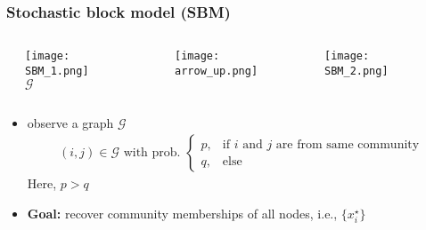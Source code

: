 \documentclass[compress,
mathserif,wide,%
]{beamer}
\begin{document}
\begin{frame}
	\frametitle{Stochastic block model (SBM)}

\vspace{-1em}


\begin{columns}

\begin{column}{0.05\textwidth}
\end{column}


\begin{column}{0.25\textwidth}
\begin{center}
  \texttt{[image: SBM\_1.png]} \\
	$\mathcal{G}$
\end{center}
\end{column}

\begin{column}{0.05\textwidth}
\end{column}


\begin{column}{0.12\textwidth}
\begin{center}
\texttt{[image: arrow\_up.png]} 
\end{center}
\end{column}


\begin{column}{0.5\textwidth}
\begin{center}
  \texttt{[image: SBM\_2.png]}
\end{center}
\end{column}

\begin{column}{0.03\textwidth}
\end{column}

\end{columns}


\bigskip


\begin{itemize}
	\itemsep0.5em
	
	\item observe a graph $\mathcal{G}$
		\vspace{-0.8em}
		\begin{align*}
			(i,j)\in \mathcal{G} \text{ with prob.~} \begin{cases} p,  & \text{if }i\text{ and }j \text{ are from same community} \\ q, & \text{else} \end{cases}
		\end{align*}
		Here, $p>q$
	\item {\bf Goal:}  recover community memberships  of all nodes, i.e., $\{x_i^{\star}\}$

\end{itemize}

\end{frame}
\end{document}
